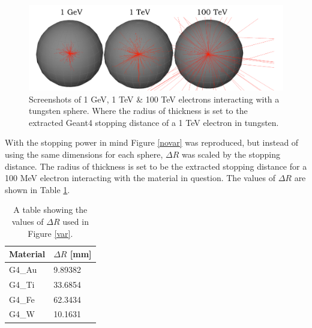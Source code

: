 \documentclass[12pt,a4paper]{article}
\begin{document}
\begin{figure}[h!]
\hspace*{1.4cm}\includegraphics[scale=0.5]{Images//BDSIM//Tungsten_Sphere.png}
\caption[width=\columnwidth]{Screenshots of 1 GeV, 1 TeV \& 100 TeV electrons interacting with a tungsten sphere. Where the radius of thickness is set to the extracted Geant4 stopping distance of a 1 TeV electron in tungsten.}
\label{tung}
\end{figure}

\noindent With the stopping power in mind Figure \ref{novar} was reproduced, but instead of using the same dimensions for each sphere, $\Delta R$ was scaled by the stopping distance. The radius of thickness is set to be the extracted stopping distance for a 100 MeV electron interacting with the material in question. The values of $\Delta R$ are shown in Table \ref{rs}.

\begin{table}[h!]
\centering
\begin{tabular}{|l|l|}
\hline
Material & $\Delta R$ [mm] \\ \hline
G4\_Au &  9.89382\\ \hline
G4\_Ti &  33.6854\\ \hline
G4\_Fe &  62.3434\\ \hline
G4\_W &  10.1631\\ \hline
\end{tabular}
\caption{A table showing the values of $\Delta R$ used in Figure \ref{var}.}
\label{rs}
\end{table}
\end{document}

